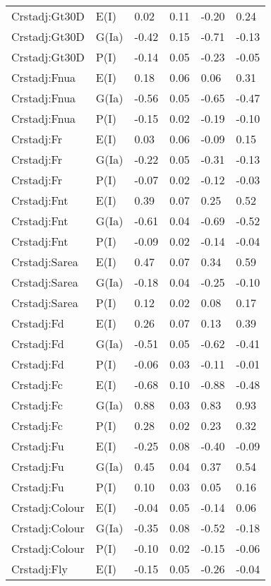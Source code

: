 \begin{center}
\begin{longtable}{|p{1.1in}|p{0.7in}|p{0.7in}|p{0.6in}|p{0.6in}|p{0.6in}|}
  Crstadj:Gt30D & E(I) & 0.02 & 0.11 & -0.20 & 0.24 \\ 
  Crstadj:Gt30D & G(Ia) & -0.42 & 0.15 & -0.71 & -0.13 \\ 
  Crstadj:Gt30D & P(I) & -0.14 & 0.05 & -0.23 & -0.05 \\ 
  Crstadj:Fnua & E(I) & 0.18 & 0.06 & 0.06 & 0.31 \\ 
  Crstadj:Fnua & G(Ia) & -0.56 & 0.05 & -0.65 & -0.47 \\ 
  Crstadj:Fnua & P(I) & -0.15 & 0.02 & -0.19 & -0.10 \\ 
  Crstadj:Fr & E(I) & 0.03 & 0.06 & -0.09 & 0.15 \\ 
  Crstadj:Fr & G(Ia) & -0.22 & 0.05 & -0.31 & -0.13 \\ 
  Crstadj:Fr & P(I) & -0.07 & 0.02 & -0.12 & -0.03 \\ 
  Crstadj:Fnt & E(I) & 0.39 & 0.07 & 0.25 & 0.52 \\ 
  Crstadj:Fnt & G(Ia) & -0.61 & 0.04 & -0.69 & -0.52 \\ 
  Crstadj:Fnt & P(I) & -0.09 & 0.02 & -0.14 & -0.04 \\ 
  Crstadj:Sarea & E(I) & 0.47 & 0.07 & 0.34 & 0.59 \\ 
  Crstadj:Sarea & G(Ia) & -0.18 & 0.04 & -0.25 & -0.10 \\ 
  Crstadj:Sarea & P(I) & 0.12 & 0.02 & 0.08 & 0.17 \\ 
  Crstadj:Fd & E(I) & 0.26 & 0.07 & 0.13 & 0.39 \\ 
  Crstadj:Fd & G(Ia) & -0.51 & 0.05 & -0.62 & -0.41 \\ 
  Crstadj:Fd & P(I) & -0.06 & 0.03 & -0.11 & -0.01 \\ 
  Crstadj:Fc & E(I) & -0.68 & 0.10 & -0.88 & -0.48 \\ 
  Crstadj:Fc & G(Ia) & 0.88 & 0.03 & 0.83 & 0.93 \\ 
  Crstadj:Fc & P(I) & 0.28 & 0.02 & 0.23 & 0.32 \\ 
  Crstadj:Fu & E(I) & -0.25 & 0.08 & -0.40 & -0.09 \\ 
  Crstadj:Fu & G(Ia) & 0.45 & 0.04 & 0.37 & 0.54 \\ 
  Crstadj:Fu & P(I) & 0.10 & 0.03 & 0.05 & 0.16 \\ 
  Crstadj:Colour & E(I) & -0.04 & 0.05 & -0.14 & 0.06 \\ 
  Crstadj:Colour & G(Ia) & -0.35 & 0.08 & -0.52 & -0.18 \\ 
  Crstadj:Colour & P(I) & -0.10 & 0.02 & -0.15 & -0.06 \\ 
  Crstadj:Fly & E(I) & -0.15 & 0.05 & -0.26 & -0.04 \\ 

\end{longtable}
\end{center}
